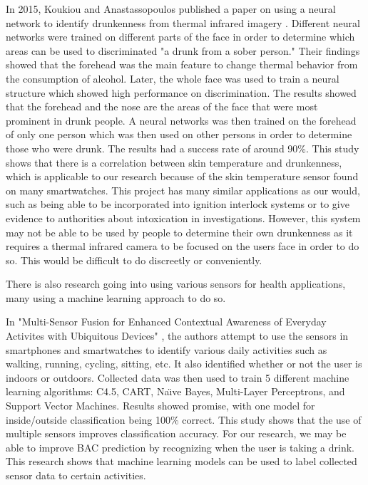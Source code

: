 In 2015, Koukiou and Anastassopoulos published a paper on using a neural network to identify drunkenness from thermal infrared imagery \cite{Koukiou:2015}. Different neural networks were trained on different parts of the face in order to determine which areas can be used to discriminated "a drunk from a sober person." Their findings showed that the forehead was the main feature to change thermal behavior from the consumption of alcohol. Later, the whole face was used to train a neural structure which showed high performance on discrimination. The results showed that the forehead and the nose are the areas of the face that were most prominent in drunk people. A neural networks was then trained on the forehead of only one person which was then used on other persons in order to determine those who were drunk. The results had a success rate of around 90\%. This study shows that there is a correlation between skin temperature and drunkenness, which is applicable to our research because of the skin temperature sensor found on many smartwatches. This project has many similar applications as our would, such as being able to be incorporated into ignition interlock systems or to give evidence to authorities about intoxication in investigations. However, this system may not be able to be used by people to determine their own drunkenness as it requires a thermal infrared camera to be focused on the users face in order to do so. This would be difficult to do discreetly or conveniently. 

There is also research going into using various sensors for health applications, many using a machine learning approach to do so. 

In "Multi-Sensor Fusion for Enhanced Contextual Awareness of Everyday Activites with Ubiquitous Devices" \cite{Guiry:2014}, the authors attempt to use the sensors in smartphones and smartwatches to identify various daily activities such as walking, running, cycling, sitting, etc. It also identified whether or not the user is indoors or outdoors. Collected data was then used to train 5 different machine learning algorithms: C4.5, CART, Na\"{\i}ve Bayes, Multi-Layer Perceptrons, and Support Vector Machines. Results showed promise, with one model for inside/outside classification being 100\% correct. This study shows that the use of multiple sensors improves classification accuracy. For our research, we may be able to improve BAC prediction by recognizing when the user is taking a drink. This research shows that machine learning models can be used to label collected sensor data to certain activities.

